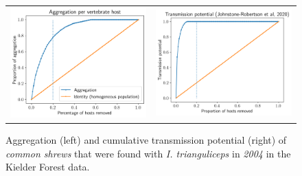 \documentclass[hidelinks]{article}
\begin{document}
\begin{figure}[]
	\begin{mdframed}[backgroundcolor=grey250,rightline=false,leftline=false,topline=false]
	\centering
	\begin{tabular}{ll}
		\includegraphics[width=.48\linewidth,valign=m]{lorenz_aggregation_SA_2004_I.Trianguliceps} & \includegraphics[width=.48\linewidth,valign=m]{lorenz_JR_SA_2004_I.Trianguliceps} \\
	\end{tabular}
	\caption{Aggregation (left) and cumulative transmission potential (right) of \textit{common shrews} that were found with \textit{I. trianguliceps} in \textit{2004} in the Kielder Forest data.}
	\label{fig:lorenz_2004_itrianguliceps_SA}
	\end{mdframed}
\end{figure}
\end{document}
